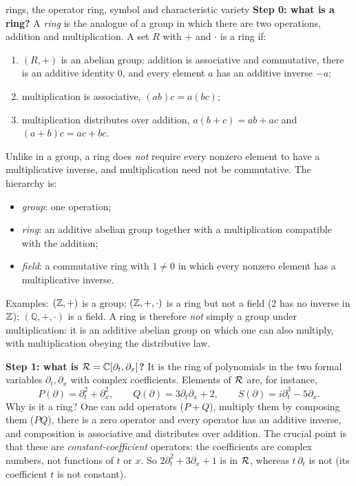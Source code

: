 \begin{explained}{rings, the operator ring, symbol and characteristic variety}
\textbf{Step 0: what is a ring?} A \emph{ring} is the analogue of a group in which there are two operations, addition and multiplication. A set $R$ with $+$ and $\cdot$ is a ring if:
\begin{enumerate}[nosep]
\item $(R,+)$ is an abelian group: addition is associative and commutative, there is an additive identity $0$, and every element $a$ has an additive inverse $-a$;
\item multiplication is associative, $(ab)c=a(bc)$;
\item multiplication distributes over addition, $a(b+c)=ab+ac$ and $(a+b)c=ac+bc$.
\end{enumerate}
Unlike in a group, a ring does \emph{not} require every nonzero element to have a multiplicative inverse, and multiplication need not be commutative. The hierarchy is:
\begin{itemize}[nosep]
\item \emph{group}: one operation;
\item \emph{ring}: an additive abelian group together with a multiplication compatible with the addition;
\item \emph{field}: a commutative ring with $1\ne0$ in which every nonzero element has a multiplicative inverse.
\end{itemize}
Examples: $(\mathbb{Z},+)$ is a group; $(\mathbb{Z},+,\cdot)$ is a ring but not a field (2 has no inverse in $\mathbb{Z}$); $(\mathbb Q,+,\cdot)$ is a field. A ring is therefore \emph{not} simply a group under multiplication: it is an additive abelian group on which one can also multiply, with multiplication obeying the distributive law.

\medskip\textbf{Step 1: what is $\mathcal{R}=\mathbb{C}[\partial_t,\partial_x]$?} It is the ring of polynomials in the two formal variables $\partial_t,\partial_x$ with complex coefficients. Elements of $\mathcal{R}$ are, for instance,
\[
P(\partial)=\partial_t^2+\partial_x^2,\qquad Q(\partial)=3\partial_t\partial_x+2,\qquad S(\partial)=i\partial_t^3-5\partial_x .
\]
Why is it a ring? One can add operators ($P+Q$), multiply them by composing them ($PQ$), there is a zero operator and every operator has an additive inverse, and composition is associative and distributes over addition. The crucial point is that these are \emph{constant-coefficient} operators: the coefficients are complex numbers, not functions of $t$ or $x$. So $2\partial_t^2+3\partial_x+1$ is in $\mathcal{R}$, whereas $t\,\partial_t$ is not (its coefficient $t$ is not constant).


\end{explained}
